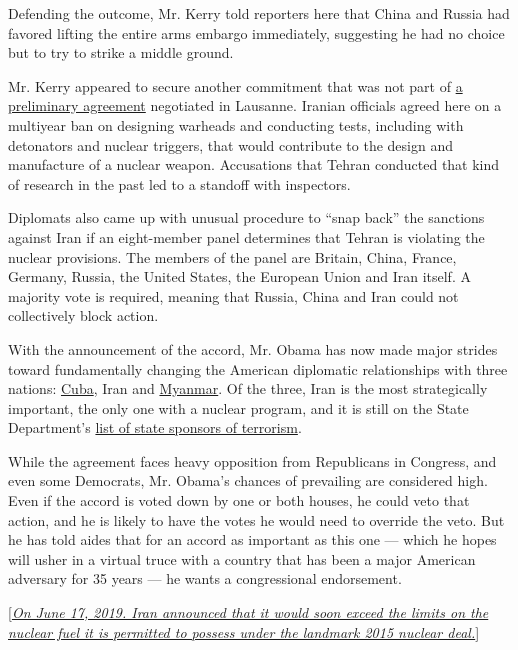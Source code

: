 Defending the outcome, Mr. Kerry told reporters here that China and
Russia had favored lifting the entire arms embargo immediately,
suggesting he had no choice but to try to strike a middle ground.

Mr. Kerry appeared to secure another commitment that was not part of
\href{http://www.nytimes3xbfgragh.onion/2015/04/04/world/middleeast/an-iran-nuclear-deal-built-on-coffee-all-nighters-and-compromise.html}{a
preliminary agreement} negotiated in Lausanne. Iranian officials agreed
here on a multiyear ban on designing warheads and conducting tests,
including with detonators and nuclear triggers, that would contribute to
the design and manufacture of a nuclear weapon. Accusations that Tehran
conducted that kind of research in the past led to a standoff with
inspectors.

Diplomats also came up with unusual procedure to ``snap back'' the
sanctions against Iran if an eight-member panel determines that Tehran
is violating the nuclear provisions. The members of the panel are
Britain, China, France, Germany, Russia, the United States, the European
Union and Iran itself. A majority vote is required, meaning that Russia,
China and Iran could not collectively block action.

With the announcement of the accord, Mr. Obama has now made major
strides toward fundamentally changing the American diplomatic
relationships with three nations:
\href{http://www.nytimes3xbfgragh.onion/2014/12/18/world/americas/us-cuba-relations.html}{Cuba},
Iran and
\href{http://www.nytimes3xbfgragh.onion/2012/01/14/world/asia/united-states-resumes-diplomatic-relations-with-myanmar.html}{Myanmar}.
Of the three, Iran is the most strategically important, the only one
with a nuclear program, and it is still on the State Department's
\href{http://www.state.gov/j/ct/list/c14151.htm}{list of state sponsors
of terrorism}.

While the agreement faces heavy opposition from Republicans in Congress,
and even some Democrats, Mr. Obama's chances of prevailing are
considered high. Even if the accord is voted down by one or both houses,
he could veto that action, and he is likely to have the votes he would
need to override the veto. But he has told aides that for an accord as
important as this one --- which he hopes will usher in a virtual truce
with a country that has been a major American adversary for 35 years ---
he wants a congressional endorsement.

{[}\emph{\href{https://www.nytimes3xbfgragh.onion/2019/06/17/world/middleeast/iran-nuclear-deal-compliance.html}{On
June 17, 2019. Iran announced that it would soon exceed the limits on
the nuclear fuel it is permitted to possess under the landmark 2015
nuclear deal.}}{]}

